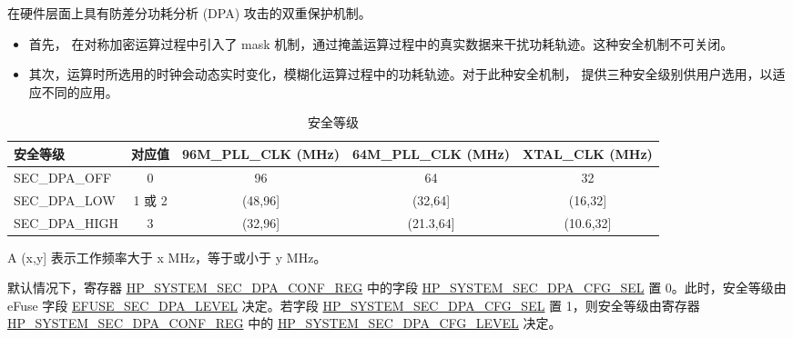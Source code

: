 \documentclass[main\_\_CN.tex]{subfiles}
\begin{document}
\chipname{} 在硬件层面上具有防差分功耗分析 (DPA) 攻击的双重保护机制。

\begin{itemize}
    \item 首先，\chipname{} 在对称加密运算过程中引入了 mask 机制，通过掩盖运算过程中的真实数据来干扰功耗轨迹。这种安全机制不可关闭。
    \item 其次，运算时所选用的时钟会动态实时变化，模糊化运算过程中的功耗轨迹。对于此种安全机制，\chipname{} 提供三种安全级别供用户选用，以适应不同的应用。
\end{itemize}


\begin{table}[H]
    \centering
    \caption{安全等级}
    \label{tab:sysreg-security-level}
    \begin{threeparttable}
    \begin{tabular}[c]{| l | c | c | c | c |}  
    \hline
    \rowcolor{lightgray}
        \textbf{安全等级} & \textbf{对应值} & \textbf{96M\_PLL\_CLK (MHz)} & \textbf{64M\_PLL\_CLK (MHz)} & \textbf{XTAL\_CLK (MHz)} \\ \hline
        SEC\_DPA\_OFF       & 0    & 96               & 64                 & 32                 \\\hline
        SEC\_DPA\_LOW       & 1 或 2    & (48,96]\tnote{A} & (32,64]\tnote{A}   & (16,32]\tnote{A}   \\\hline
        SEC\_DPA\_HIGH      & 3    & (32,96]\tnote{A} & (21.3,64]\tnote{A} & (10.6,32]\tnote{A}   \\\hline
    \end{tabular}
    \begin{tablenotes}
        \item[A] (x,y] 表示工作频率大于 x MHz，等于或小于 y MHz。
    \end{tablenotes}
    \end{threeparttable}
\end{table}

默认情况下，寄存器 \hyperref[regdesc:HPSYSTEMSECDPACONFREG]{HP\_SYSTEM\_SEC\_DPA\_CONF\_REG} 中的字段 \hyperref[fielddesc:HPSYSTEMSECDPALEVEL]{HP\_SYSTEM\_SEC\_DPA\_CFG\_SEL} 置 0。此时，安全等级由 eFuse 字段 \hyperref[fielddesc:EFUSESECDPALEVEL]{EFUSE\_SEC\_DPA\_LEVEL} 决定。若字段 \hyperref[fielddesc:HPSYSTEMSECDPALEVEL]{HP\_SYSTEM\_SEC\_DPA\_CFG\_SEL} 置 1，则安全等级由寄存器 \hyperref[regdesc:HPSYSTEMSECDPACONFREG]{HP\_SYSTEM\_SEC\_DPA\_CONF\_REG} 中的 \hyperref[fielddesc:HPSYSTEMSECDPALEVEL]{HP\_SYSTEM\_SEC\_DPA\_CFG\_LEVEL} 决定。
\end{document}
